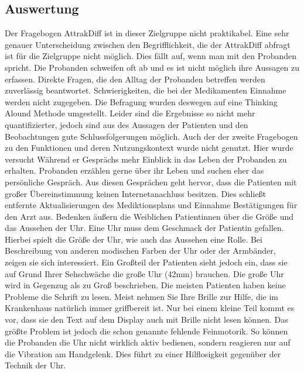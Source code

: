 \subsection{Auswertung}
Der Fragebogen AttrakDiff ist in dieser Zielgruppe nicht praktikabel. Eine sehr genauer Unterscheidung zwischen den Begrifflichkeit, die der  AttrakDiff abfragt ist für die Zielgruppe nicht möglich. Dies fällt auf, wenn man mit den Probanden spricht. Die Probanden schweifen oft ab und es ist nicht möglich ihre Aussagen zu erfassen. Direkte Fragen, die den Alltag der Probanden betreffen werden zuverlässig beantwortet. Schwierigkeiten, die bei der Medikamenten Einnahme werden nicht zugegeben.
Die Befragung wurden deswegen auf eine Thinking Alound Methode \cite{Sommerville:2016aa} umgestellt. Leider sind die Ergebnisse so nicht mehr quantifizierter, jedoch sind aus des Aussagen der Patienten und den Beobachtungen gute Schlussfolgerungen möglich.
Auch der der zweite Fragebogen zu den Funktionen und deren Nutzungskontext wurde nicht genutzt. Hier wurde versucht 
Während er Gesprächs  mehr Einblick in das Leben der Probanden zu erhalten. Probanden erzählen gerne über ihr Leben und suchen eher das persönliche Gespräch. Aus diesen Gesprächen geht hervor, dass die Patienten mit großer Übereinstimmung keinen Internetanachluss besitzen. Dies schließt entfernte Aktualisierungen des Mediktionsplans und Einnahme Bestätigungen für den Arzt aus. Bedenken äußern die Weiblichen Patientinnen über die Größe und das Aussehen der Uhr. Eine Uhr muss dem Geschmack der Patientin gefallen. Hierbei spielt die Größe der Uhr, wie auch das Aussehen eine Rolle. Bei Beschreibung von anderen modischen Farben der Uhr oder der Armbänder, zeigen sie sich interessiert.  Ein Großteil der Patienten sieht jedoch ein, dass sie auf Grund Ihrer Sehschwäche die große Uhr (42mm) brauchen. Die große Uhr wird in Gegenzug als zu Groß beschrieben. Die meisten Patienten haben keine Probleme die Schrift zu lesen. Meist nehmen Sie Ihre Brille zur Hilfe, die im Krankenhaus natürlich immer griffbereit ist. Nur bei einem kleine Teil kommt es vor, dass sie den Text auf dem Display auch mit Brille nicht lesen können. Das größte Problem ist jedoch die schon genannte fehlende Feinmotorik. So können die Probanden die Uhr nicht wirklich aktiv bedienen, sondern reagieren nur auf die Vibration am Handgelenk. Dies führt zu einer Hilflosigkeit gegenüber der Technik der Uhr.
